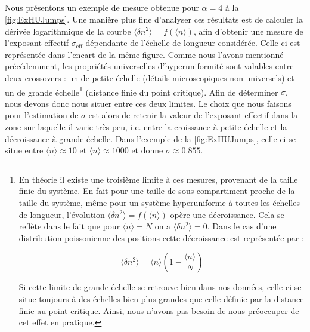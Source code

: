 \subparagraph{}Nous présentons un exemple de mesure obtenue pour $\alpha=4$ à la \autoref{fig:ExHUJumps}. Une manière plus fine d'analyser ces résultats est de calculer la dérivée logarithmique de la courbe $\langle \delta n^2 \rangle = f(\langle n \rangle)$, afin d'obtenir une mesure de l'exposant effectif $\sigma_\text{eff}$ dépendante de l'échelle de longueur considérée. Celle-ci est représentée dans l'encart de la même figure. Comme nous l'avons mentionné précédemment, les propriétés universelles d'hyperuniformité sont valables entre deux crossovers : un de petite échelle (détails microscopiques non-universels) et un de grande échelle\footnote{En théorie il existe une troisième limite à ces mesures, provenant de la taille finie du système. En fait pour une taille de sous-compartiment proche de la taille du système, même pour un système hyperuniforme à toutes les échelles de longueur, l'évolution  $\langle \delta n^2 \rangle = f(\langle n \rangle)$ opère une décroissance. Cela se reflète dans le fait que pour $\langle n \rangle = N$ on a $\langle \delta n^2 \rangle =0$. Dans le cas d'une distribution poissonienne des positions cette décroissance est représentée par :

\begin{equation}
	 \langle \delta n^2 \rangle  = \langle n \rangle \left( 1-\frac{\langle n \rangle}{N} \right)
\end{equation}

\noindent Si cette limite de grande échelle se retrouve bien dans nos données, celle-ci se situe toujours à des échelles bien plus grandes que celle définie par la distance finie au point critique. Ainsi, nous n'avons pas besoin de nous préoccuper de cet effet en pratique.} (distance finie du point critique). Afin de déterminer $\sigma$, nous devons donc nous situer entre ces deux limites. Le choix que nous faisons pour l'estimation de $\sigma$ est alors de retenir la valeur de l'exposant effectif dans la zone sur laquelle il varie très peu, i.e. entre la croissance à petite échelle et la décroissance à grande échelle. Dans l'exemple de la \autoref{fig:ExHUJumps}, celle-ci se situe entre $\langle n \rangle \approx 10$ et $\langle n \rangle \approx 1000$ et donne $\sigma\approx 0.855$.

